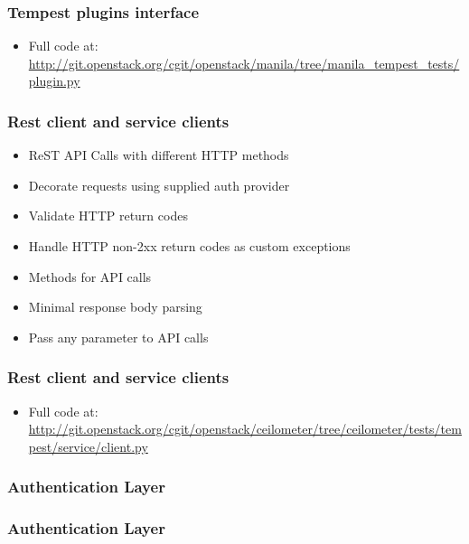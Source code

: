 \documentclass[aspectratio=169,11pt,hyperref={colorlinks=true}]{beamer}
\begin{document}
\begin{frame}
    \frametitle{Tempest plugins interface}
    
    \begin{itemize}
        \item \tiny Full code at: \href{http://git.openstack.org/cgit/openstack/manila/tree/manila_tempest_tests/plugin.py}{http://git.openstack.org/cgit/openstack/manila/tree/manila\_tempest\_tests/plugin.py}
    \end{itemize}
\end{frame}

\begin{frame}
    \frametitle{Rest client and service clients}
    \begin{itemize}
        \item ReST API Calls with different HTTP methods
        \item Decorate requests using supplied auth provider
        \item Validate HTTP return codes
        \item Handle HTTP non-2xx return codes as custom exceptions
    \end{itemize}
    \begin{itemize}
        \item Methods for API calls
        \item Minimal response body parsing
        \item Pass any parameter to API calls
    \end{itemize}
\end{frame}

\begin{frame}
    \frametitle{Rest client and service clients}
    
    \begin{itemize}
        \item \tiny Full code at: \href{http://git.openstack.org/cgit/openstack/ceilometer/tree/ceilometer/tests/tempest/service/client.py}{http://git.openstack.org/cgit/openstack/ceilometer/tree/ceilometer/tests/tempest/service/client.py}
    \end{itemize}
\end{frame}

\begin{frame}
    \frametitle{Authentication Layer}
\end{frame}

\begin{frame}
    \frametitle{Authentication Layer}
\end{frame}
\end{document}
